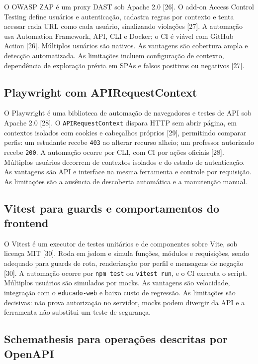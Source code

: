 O OWASP ZAP é um proxy DAST sob Apache 2.0 {[}26{]}. O add-on Access
Control Testing define usuários e autenticação, cadastra regras por
contexto e tenta acessar cada URL como cada usuário, sinalizando
violações {[}27{]}. A automação usa Automation Framework, API, CLI e
Docker; o CI é viável com GitHub Action {[}26{]}. Múltiplos usuários são
nativos. As vantagens são cobertura ampla e detecção automatizada. As
limitações incluem configuração de contexto, dependência de exploração
prévia em SPAs e falsos positivos ou negativos {[}27{]}.

\subsection{Playwright com
APIRequestContext}\label{playwright-com-apirequestcontext}

O Playwright é uma biblioteca de automação de navegadores e testes de
API sob Apache 2.0 {[}28{]}. O \texttt{APIRequestContext} dispara HTTP
sem abrir página, em contextos isolados com cookies e cabeçalhos
próprios {[}29{]}, permitindo comparar perfis: um estudante recebe
\texttt{403} ao alterar recurso alheio; um professor autorizado recebe
\texttt{200}. A automação ocorre por CLI, com CI por ações oficiais
{[}28{]}. Múltiplos usuários decorrem de contextos isolados e do estado
de autenticação. As vantagens são API e interface na mesma ferramenta e
controle por requisição. As limitações são a ausência de descoberta
automática e a manutenção manual.

\subsection{Vitest para guards e comportamentos do
frontend}\label{vitest-para-guards-e-comportamentos-do-frontend}

O Vitest é um executor de testes unitários e de componentes sobre Vite,
sob licença MIT {[}30{]}. Roda em jsdom e simula funções, módulos e
requisições, sendo adequado para guards de rota, renderização por perfil
e mensagens de negação {[}30{]}. A automação ocorre por
\texttt{npm\ test} ou \texttt{vitest\ run}, e o CI executa o script.
Múltiplos usuários são simulados por mocks. As vantagens são velocidade,
integração com o \texttt{educado-web} e baixo custo de regressão. As
limitações são decisivas: não prova autorização no servidor, mocks podem
divergir da API e a ferramenta não substitui um teste de segurança.

\subsection{Schemathesis para operações descritas por
OpenAPI}\label{schemathesis-para-operauxe7uxf5es-descritas-por-openapi}

